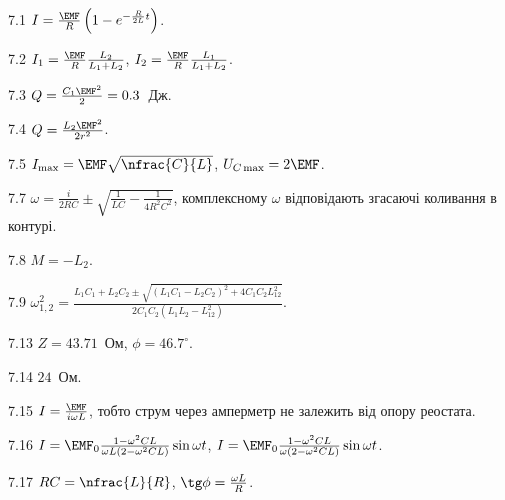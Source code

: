 \protect \section *{}
\begin{Solution}{7.{1}}
	$I = \frac{\EMF}{R}\left( 1-e^{-\frac{R}{2L}t}\right) $.
\end{Solution}
\begin{Solution}{7.{2}}
	$I_1 = \frac{\EMF}{R} \frac{L_2}{L_1 + L_2}$, $I_2 = \frac{\EMF}{R} \frac{L_1}{L_1 + L_2}$.
\end{Solution}
\begin{Solution}{7.{3}}
	$Q = \frac{C_1\EMF^2}{2} = 0.3$~Дж.
\end{Solution}
\begin{Solution}{7.{4}}
	$Q = \frac{L_2\EMF^2}{2r^2}$.
\end{Solution}
\begin{Solution}{7.{5}}
	$I_{\max} = \EMF\sqrt{\nfrac{C}{L}}$, $U_{C\max} =2 \EMF$.
\end{Solution}
\begin{Solution}{7.{7}}
	$\omega = \frac{i}{2RC} \pm \sqrt{\frac{1}{LC} - \frac{1}{4R^2C^2}}$, комплексному $\omega$ відповідають згасаючі коливання в контурі.
\end{Solution}
\begin{Solution}{7.{8}}
	$M = -L_2$.
\end{Solution}
\begin{Solution}{7.{9}}
	$\omega_{1,2}^2 = \frac{L_1C_1 + L_2C_2 \pm \sqrt{(L_1C_1 - L_2C_2)^2 + 4C_1C_2L_{12}^2}}{2C_1C_2(L_1L_2 - L_{12}^2)}$.
\end{Solution}
\begin{Solution}{7.{13}}
	$Z = 43.71$~Ом, $\phi = 46.7^\circ$.
\end{Solution}
\begin{Solution}{7.{14}}
	$24$~Ом.
\end{Solution}
\begin{Solution}{7.{15}}
	$I = \frac{\EMF}{i\omega L}$, тобто струм через амперметр не залежить від опору реостата.
\end{Solution}
\begin{Solution}{7.{16}}
	$I = \EMF_0\frac{1 - \omega^2CL}{\omega L(2 - \omega^2CL)}\sin\omega t$, $I = \EMF_0\frac{1 - \omega^2CL}{\omega(2 - \omega^2CL)}\sin\omega t$.
\end{Solution}
\begin{Solution}{7.{17}}
	$RC = \nfrac{L}{R}$, $\tg\phi = \frac{\omega L}{R}$.
\end{Solution}
